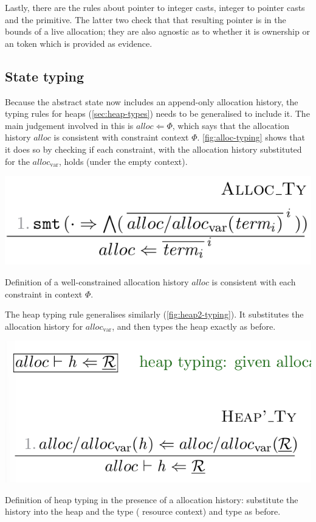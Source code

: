 Lastly, there are the rules about pointer to integer casts, integer to pointer
casts and the  primitive. The latter two check that that
resulting pointer is in the bounds of a live allocation; they are also agnostic
as to whether it is ownership or an  token which is provided as
evidence.

\subsection{State typing}

Because the abstract state now includes an append-only allocation history, the
typing rules for heaps (\cref{sec:heap-types}) needs to be generalised to
include it. The main judgement involved in this is $\mathit{alloc} \Leftarrow
\Phi$, which says that the allocation history $\mathit{alloc}$ is consistent
with constraint context $\Phi$. \cref{fig:alloc-typing} shows that it does so
by checking if each constraint, with the allocation history substituted for the
$\mathit{alloc}_\mathrm{var}$, holds (under the empty context).

\begin{marginfigure}
    \includegraphics{figures/alloc-typing}
    \caption{Definition of a well-constrained allocation history \textemdash{}
        $\mathit{alloc}$ is consistent with each constraint in context
        $\Phi$.}\label{fig:alloc-typing}
\end{marginfigure}

The heap typing rule generalises similarly (\cref{fig:heap2-typing}). It
substitutes the allocation history for $\mathit{alloc}_\mathrm{var}$, and then
types the heap exactly as before.

\begin{marginfigure}
    \includegraphics{figures/heap2-typing}
    \caption{Definition of heap typing in the presence of a allocation history:
        substitute the history into the heap and the type (
        resource context) and type as before.}\label{fig:heap2-typing}
\end{marginfigure}

